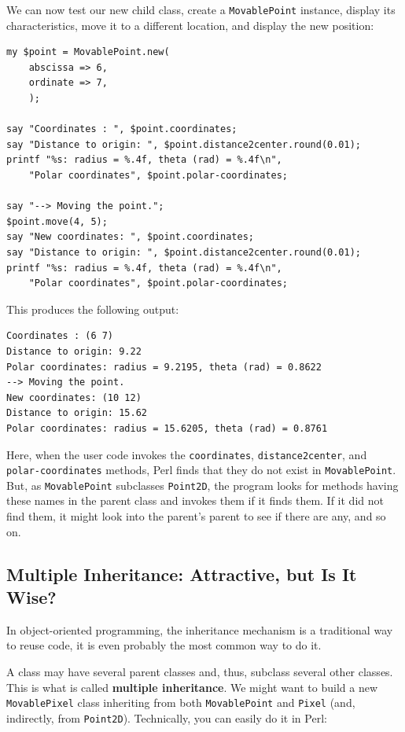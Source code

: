 We can now test our new child class, create a {\tt MovablePoint} 
instance, display its characteristics, move it to a different 
location, and display the new position:

\begin{verbatim}
my $point = MovablePoint.new(
    abscissa => 6,
    ordinate => 7,
    );

say "Coordinates : ", $point.coordinates;
say "Distance to origin: ", $point.distance2center.round(0.01);
printf "%s: radius = %.4f, theta (rad) = %.4f\n", 
    "Polar coordinates", $point.polar-coordinates;

say "--> Moving the point.";
$point.move(4, 5);
say "New coordinates: ", $point.coordinates;
say "Distance to origin: ", $point.distance2center.round(0.01);
printf "%s: radius = %.4f, theta (rad) = %.4f\n", 
    "Polar coordinates", $point.polar-coordinates;
\end{verbatim}

This produces the following output:

\begin{verbatim}
Coordinates : (6 7)
Distance to origin: 9.22
Polar coordinates: radius = 9.2195, theta (rad) = 0.8622
--> Moving the point.
New coordinates: (10 12)
Distance to origin: 15.62
Polar coordinates: radius = 15.6205, theta (rad) = 0.8761
\end{verbatim}

Here, when the user code invokes the {\tt coordinates}, 
{\tt distance2center}, and {\tt polar-coordinates} methods, 
Perl finds that they do not exist in {\tt MovablePoint}. But,  
as \verb'MovablePoint' subclasses {\tt Point2D}, the program 
looks for methods having these names in the parent class and 
invokes them if it finds them. 	If it did not find them, it 
might look into the parent's parent to see if there are any, and 
so on.


\subsection{Multiple Inheritance: Attractive, but Is It Wise?}

In object-oriented programming, the inheritance mechanism is 
a traditional way to reuse code, it is even probably the most 
common way to do it. 

A class may have several parent classes and, thus, subclass 
several other classes. This is what is called {\bf multiple 
inheritance}. We might want to build a new {\tt MovablePixel} 
class inheriting from both {\tt MovablePoint} and {\tt Pixel} 
(and, indirectly, from {\tt Point2D}). Technically, you can 
easily do it in Perl:


